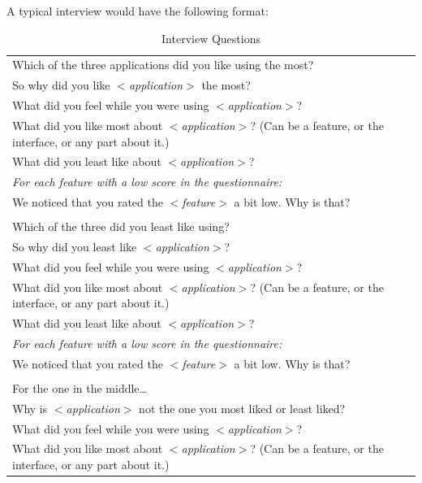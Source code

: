 		\newpage
		A typical interview would have the following format:
		\begin{longtable}{|p{14cm}|}
			\caption{Interview Questions} \label{tab:interview-questions} \\ 
		  	\hline
		  	Which of the three applications did you like using the most? \\ 
		  	So why did you like \textit{$<$application$>$} the most? \\ 
		  	What did you feel while you were using \textit{$<$application$>$}? \\ 
		  	What did you like most about \textit{$<$application$>$}? (Can be a feature, or the interface, or any part about it.) \\ 
		  	What did you least like about \textit{$<$application$>$}? \\ 
		  	\textit{For each feature with a low score in the questionnaire:} \\ 
		  	\hspace{6mm}We noticed that you rated the \textit{$<$feature$>$} a bit low. Why is that? \\ 
		  	\\
		  	Which of the three did you least like using? \\ 
		  	So why did you least like \textit{$<$application$>$}? \\ 
		  	What did you feel while you were using \textit{$<$application$>$}? \\ 
		  	What did you like most about \textit{$<$application$>$}? (Can be a feature, or the interface, or any part about it.) \\ 
		  	What did you least like about \textit{$<$application$>$}? \\ 
		  	\textit{For each feature with a low score in the questionnaire:} \\ 
		  	\hspace{6mm}We noticed that you rated the \textit{$<$feature$>$} a bit low. Why is that? \\ 
		  	\\
		  	For the one in the middle\ldots \\ 
		  	Why is \textit{$<$application$>$} not the one you most liked or least liked? \\
		  	What did you feel while you were using \textit{$<$application$>$}? \\ 
		  	What did you like most about \textit{$<$application$>$}? (Can be a feature, or the interface, or any part about it.) \\ 

\end{longtable}
